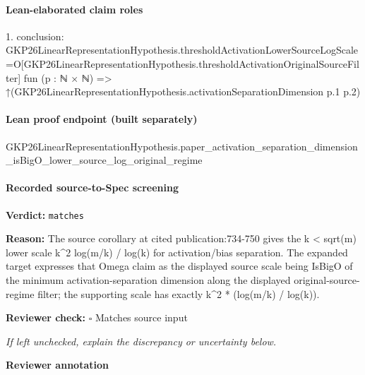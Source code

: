 \documentclass[10pt]{article}
\newcommand{\reviewerbox}{%
  \par\noindent\fbox{\parbox{0.96\linewidth}{\rule{0pt}{0.38in}}}\par
}
\newcommand{\reviewmatch}[1]{%
  \par\noindent\textbf{Reviewer check:} $\square$\; #1\par
  \noindent\emph{If left unchecked, explain the discrepancy or uncertainty below.}\par
}
\begin{document}
\paragraph{Lean-elaborated claim roles}\begin{ReviewVerbatim}
1. conclusion: GKP26LinearRepresentationHypothesis.thresholdActivationLowerSourceLogScale =O[GKP26LinearRepresentationHypothesis.thresholdActivationOriginalSourceFilter]
  fun (p : ℕ × ℕ) => ↑(GKP26LinearRepresentationHypothesis.activationSeparationDimension p.1 p.2)
\end{ReviewVerbatim}

\paragraph{Lean proof endpoint (built separately)}\begin{ReviewVerbatim}
GKP26LinearRepresentationHypothesis.paper_activation_separation_dimension_isBigO_lower_source_log_original_regime
\end{ReviewVerbatim}

\paragraph{Recorded source-to-Spec screening}
\textbf{Verdict:} \texttt{matches}
\\
{\raggedright
\textbf{Reason:} The source corollary at cited publication:\allowbreak{}734-\allowbreak{}750 gives the k < sqrt(m) lower scale k\textasciicircum{}2 log(m/\allowbreak{}k) /\allowbreak{} log(k) for activation/\allowbreak{}bias separation.\allowbreak{} The expanded target expresses that Omega claim as the displayed source scale being IsBigO of the minimum activation-\allowbreak{}separation dimension along the displayed original-\allowbreak{}source-\allowbreak{}regime filter;\allowbreak{} the supporting scale has exactly k\textasciicircum{}2 * (log(m/\allowbreak{}k) /\allowbreak{} log(k)).\allowbreak{}
\par}
\reviewmatch{Matches source input}
\noindent\textbf{Reviewer annotation}\par
\reviewerbox
\end{document}
